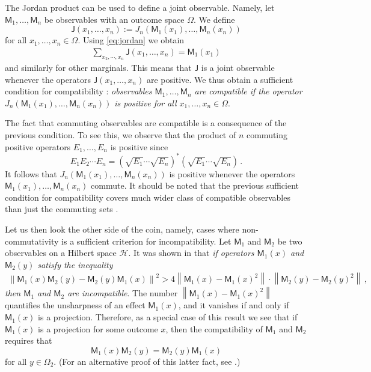 \documentclass[12pt]{iopart}
\theoremstyle{definition}
\newcommand{\hi}{\mathcal{H}} %
\newcommand{\no}[1]{\left\|#1\right\|} %
\newcommand{\Jo}{\mathsf{J}}%
\newcommand{\Mo}{\mathsf{M}}%
\begin{document}
The Jordan product can be used to define a joint observable.
Namely, let $\Mo_1,\ldots,\Mo_n$ be observables with an outcome space $\Omega$.
We define
\begin{equation}
\Jo(x_1,\ldots,x_n) := J_n(\Mo_1(x_1),\ldots,\Mo_n(x_n))
\end{equation}
for all $x_1,\ldots,x_n\in\Omega$.
Using \eqref{eq:jordan} we obtain
\begin{align}
\sum_{x_2,\cdots,x_n} \Jo(x_1,\ldots,x_n) = \Mo_1(x_1)
\end{align}
and similarly for other marginals.
This means that $\Jo$ is a joint observable whenever the operators $ \Jo(x_1,\ldots,x_n)$ are positive.
We thus obtain a sufficient condition for compatibility \cite{Heinosaari13}: \emph{observables $\Mo_1,\ldots,\Mo_n$ are compatible if the operator $J_n(\Mo_1(x_1),\ldots,\Mo_n(x_n))$ is positive for all $x_1,\ldots,x_n\in\Omega$}.

The fact that commuting observables are compatible is a consequence of the previous condition.
To see this, we observe that the product of $n$ commuting positive operators $E_1,\ldots,E_n$ is positive since 
\begin{equation}
E_1E_2\cdots E_n =  \left( \sqrt{E_1}\cdots\sqrt{E_{n}} \right)^* \left( \sqrt{E_1}\cdots\sqrt{E_{n}} \right) \, .
\end{equation}
It follows that $J_n(\Mo_1(x_1),\ldots,\Mo_n(x_n))$ is positive whenever the operators $\Mo_1(x_1),\ldots,\Mo_n(x_n)$ commute.
It should be noted that the previous sufficient condition for compatibility covers much wider class of compatible observables than just the commuting sets \cite{Heinosaari13}.

Let us then look the other side of the coin, namely, cases where non-commutativity is 
a sufficient criterion for incompatibility. 
Let $\Mo_1$ and $\Mo_2$ 
be two observables on a Hilbert space $\hi$. 
It was shown in \cite{MiIm08} that \emph{if operators $\Mo_1(x)$ and $\Mo_2(y)$ 
satisfy the inequality
\begin{align}\label{eq:tm-ineq}
\no{\Mo_1(x)\Mo_2(y) - \Mo_2(y)\Mo_1(x)} ^2 >
4 \no{ \Mo_1(x) - \Mo_1(x)^2 }
\cdot
\no{ \Mo_2(y) - \Mo_2(y)^2 } \, , 
\end{align}
then $\Mo_1$ and $\Mo_2$ are incompatible}. 
The number $\no{ \Mo_1(x) -\Mo_1(x)^2}$ quantifies the 
unsharpness of an effect $\Mo_1(x)$, and it vanishes if and only if 
$\Mo_1(x)$ is a projection. 
Therefore, as a special case of this result we see that if $\Mo_1(x)$ is a projection for some outcome $x$, then the compatibility of $\Mo_1$ and $\Mo_2$ requires that 
\begin{equation}
\Mo_1(x)\Mo_2(y)=\Mo_2(y)\Mo_1(x)
\end{equation}
 for all $y\in\Omega_2$.
 (For an alternative proof of this latter fact, see \cite{HeReSt08}.)
\end{document}
